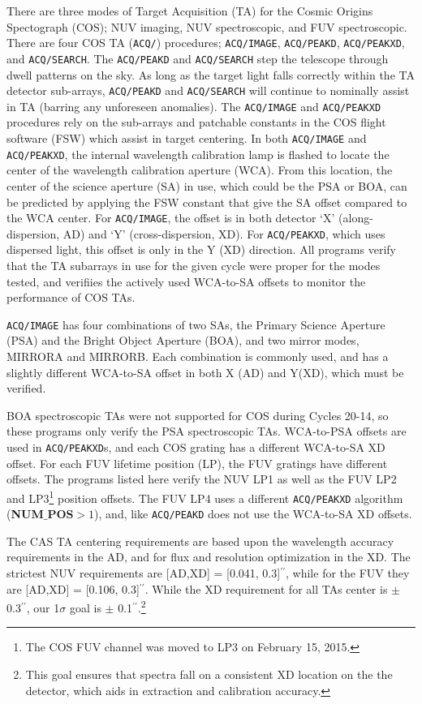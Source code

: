 \documentclass{stsci_report}
\def\arcsec{\hbox{$^{\prime\prime}$}}
\newcommand{\tacq}[1]{\texttt{ACQ/#1}}
\begin{document}
There are three modes of Target Acquisition (TA) for the Cosmic Origins Spectograph (COS); NUV imaging, NUV spectroscopic, and FUV spectroscopic.
There are four COS TA (\tacq{}) procedures; \tacq{IMAGE}, \tacq{PEAKD}, \tacq{PEAKXD}, and \tacq{SEARCH}. The \tacq{PEAKD} and \tacq{SEARCH}
step the telescope through dwell patterns on the sky. As long as the target light falls correctly within
the TA detector sub-arrays, \tacq{PEAKD} and \tacq{SEARCH} will continue to nominally assist in TA (barring any unforeseen anomalies). The \tacq{IMAGE} and \tacq{PEAKXD} procedures rely on the sub-arrays and patchable constants
in the COS flight software (FSW) which assist in target centering. In both \tacq{IMAGE} and \tacq{PEAKXD}, the internal
wavelength calibration lamp is flashed to locate the center of the wavelength calibration aperture (WCA). From this location, the center of the
science aperture (SA) in use, which could be the PSA or BOA, can be predicted by applying the FSW constant that give the SA offset compared to the WCA center. For \tacq{IMAGE},
the offset is in both detector `X' (along-dispersion, AD) and `Y' (cross-dispersion, XD). For \tacq{PEAKXD}, which uses dispersed light, this offset is only in the Y (XD) direction. All programs verify that the TA subarrays
in use for the given cycle were proper for the modes tested, and verifiies the actively used WCA-to-SA offsets to monitor the performance of COS TAs.

\tacq{IMAGE} has four combinations of two SAs, the Primary Science Aperture (PSA) and the Bright
Object Aperture (BOA), and two mirror modes, MIRRORA and MIRRORB. Each combination is commonly used, and has a slightly different WCA-to-SA offset in both X (AD) and Y(XD), which must be verified.

BOA spectroscopic TAs were not supported for COS during Cycles 20-14, so these programs only verify the PSA spectroscopic TAs.
WCA-to-PSA offsets are used in \tacq{PEAKXD}s, and each COS grating has a different WCA-to-SA XD offset. For each FUV lifetime position (LP),
the FUV gratings have different offsets. The programs listed here verify the NUV LP1 as well as the FUV LP2 and LP3\footnote{The COS FUV channel was moved to LP3 on February 15, 2015.} position offsets.
The FUV LP4 uses a different \tacq{PEAKXD} algorithm ({{\bf NUM$\_$POS}\rm}$>1$), and, like \tacq{PEAKD} does not use the WCA-to-SA XD offsets.

The CAS TA centering requirements are based upon the wavelength accuracy requirements in the AD, and for flux and resolution optimization
in the XD. The strictest NUV requirements are [AD,XD] = [0.041, 0.3]\arcsec, while for the FUV they are [AD,XD] = [0.106, 0.3]\arcsec. While the XD
requirement for all TAs center is $\pm$ 0.3\arcsec, our 1$\sigma$ goal is $\pm$ 0.1\arcsec.\footnote{This goal ensures that spectra fall on a consistent XD location on the the detector, which aids in extraction and calibration accuracy.}
\end{document}
